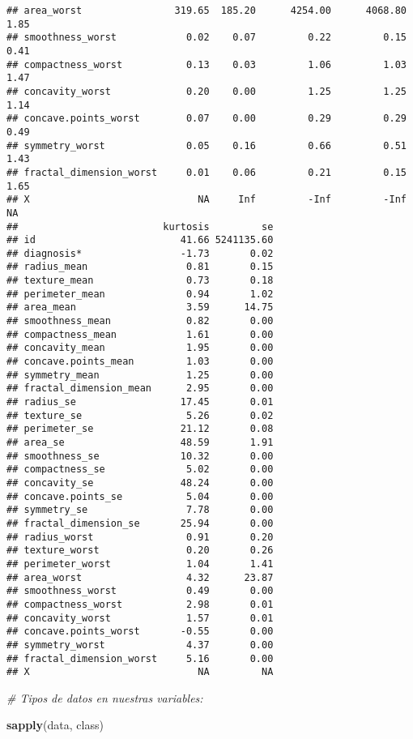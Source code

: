 \documentclass[
]{article}
\newenvironment{Shaded}{\begin{snugshade}}{\end{snugshade}}
\newcommand{\CommentTok}[1]{\textcolor[rgb]{0.56,0.35,0.01}{\textit{#1}}}
\newcommand{\FunctionTok}[1]{\textcolor[rgb]{0.13,0.29,0.53}{\textbf{#1}}}
\newcommand{\NormalTok}[1]{#1}
\begin{document}
\begin{verbatim}
## area_worst                319.65  185.20      4254.00      4068.80 1.85
## smoothness_worst            0.02    0.07         0.22         0.15 0.41
## compactness_worst           0.13    0.03         1.06         1.03 1.47
## concavity_worst             0.20    0.00         1.25         1.25 1.14
## concave.points_worst        0.07    0.00         0.29         0.29 0.49
## symmetry_worst              0.05    0.16         0.66         0.51 1.43
## fractal_dimension_worst     0.01    0.06         0.21         0.15 1.65
## X                             NA     Inf         -Inf         -Inf   NA
##                         kurtosis         se
## id                         41.66 5241135.60
## diagnosis*                 -1.73       0.02
## radius_mean                 0.81       0.15
## texture_mean                0.73       0.18
## perimeter_mean              0.94       1.02
## area_mean                   3.59      14.75
## smoothness_mean             0.82       0.00
## compactness_mean            1.61       0.00
## concavity_mean              1.95       0.00
## concave.points_mean         1.03       0.00
## symmetry_mean               1.25       0.00
## fractal_dimension_mean      2.95       0.00
## radius_se                  17.45       0.01
## texture_se                  5.26       0.02
## perimeter_se               21.12       0.08
## area_se                    48.59       1.91
## smoothness_se              10.32       0.00
## compactness_se              5.02       0.00
## concavity_se               48.24       0.00
## concave.points_se           5.04       0.00
## symmetry_se                 7.78       0.00
## fractal_dimension_se       25.94       0.00
## radius_worst                0.91       0.20
## texture_worst               0.20       0.26
## perimeter_worst             1.04       1.41
## area_worst                  4.32      23.87
## smoothness_worst            0.49       0.00
## compactness_worst           2.98       0.01
## concavity_worst             1.57       0.01
## concave.points_worst       -0.55       0.00
## symmetry_worst              4.37       0.00
## fractal_dimension_worst     5.16       0.00
## X                             NA         NA
\end{verbatim}

\begin{Shaded}
\begin{Highlighting}[]
\CommentTok{\# Tipos de datos en nuestras variables:}

\FunctionTok{sapply}\NormalTok{(data, class)}
\end{Highlighting}
\end{Shaded}
\end{document}
